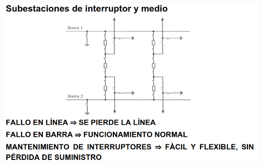 \documentclass[10pt,a4paper]{article}
\begin{document}
\begin{center}
    \includegraphics[scale = 0.6]{11.png}
\end{center}
\end{document}
